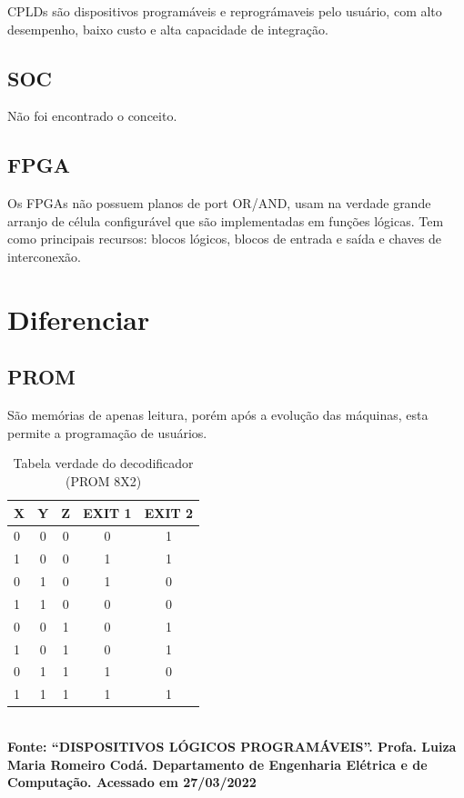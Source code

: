 CPLDs são dispositivos programáveis e reprográmaveis pelo usuário, com alto desempenho, baixo custo e alta capacidade de integração.

\subsection{\esp SOC}
Não foi encontrado o conceito.

\subsection{\esp FPGA}

Os FPGAs não possuem planos de port OR/AND, usam na verdade grande arranjo de célula configurável que são implementadas em funções lógicas. Tem como principais recursos: blocos lógicos, blocos de entrada e saída e chaves de interconexão.






\section{\esp Diferenciar}

\subsection{\esp PROM}

São memórias de apenas leitura, porém após a evolução das máquinas, esta permite a programação de usuários.

\begin{table}[htb]
	\centering
	\caption{\hspace{0.1cm} Tabela verdade do decodificador (PROM 8X2)}
	\vspace{-0.3cm} %
	\label{tab:tabela1}
	\begin{tabular}{l|c |c | c | c}
  \hline
    \textbf{X}	& \textbf{Y} & \textbf{Z}  & \textbf{EXIT 1} & \textbf{EXIT 2} \\
    \hline
        0	& 0 & 0 &  0  &  1  \\
        1	& 0 &  0 & 1 & 1  \\
        0	& 1 & 0 & 1 & 0  \\
        1   &  1 & 0 & 0 & 0  \\
        0	& 0  &  1 & 0 & 1 \\
        1   &  0 & 1 & 0 & 1  \\
        0  & 1  &  1 & 1 & 0 \\
        1  & 1  &  1 & 1 & 1 \\
     \hline
 \end{tabular}
 	\vspace{.1cm}  %
	\small
	{\footnotesize\\ \textbf{Fonte: “DISPOSITIVOS LÓGICOS PROGRAMÁVEIS”. Profa. Luiza Maria Romeiro Codá. Departamento de Engenharia Elétrica e de Computação.  Acessado em 27/03/2022}}
\end{table}



